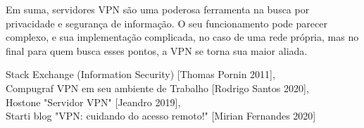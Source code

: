 \documentclass[12pt]{article}
\begin{document}
\begin{flushleft}
Em suma, servidores VPN são uma poderosa ferramenta na busca por privacidade e segurança de informação. O seu funcionamento pode parecer complexo, e sua implementação complicada, no caso de uma rede própria, mas no final para quem busca esses pontos, a VPN se torna sua maior aliada. 















Stack Exchange (Information Security) [Thomas Pornin 2011],\\
Compugraf VPN em seu ambiente de Trabalho [Rodrigo Santos 2020], \\
Hostone "Servidor VPN" [Jeandro 2019],\\
Starti blog "VPN: cuidando do acesso remoto!" [Mirian Fernandes 2020]\\

\end{flushleft}
\end{document}
